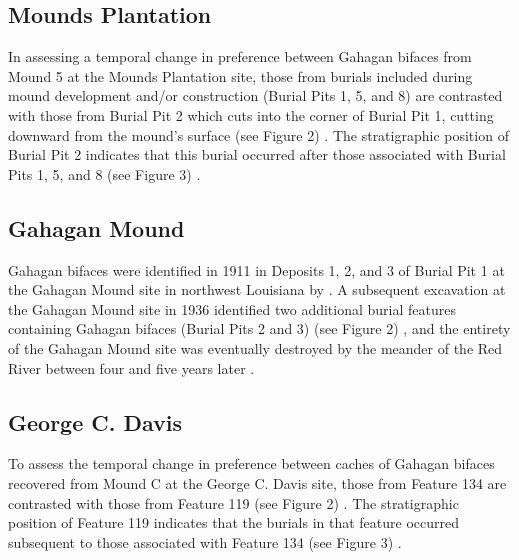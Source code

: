 \documentclass[]{interact}
\theoremstyle{plain}%
\theoremstyle{definition}
\theoremstyle{remark}
\begin{document}
\hypertarget{mounds-plantation}{%
\subsection{Mounds Plantation}\label{mounds-plantation}}

In assessing a temporal change in preference between Gahagan bifaces
from Mound 5 at the Mounds Plantation site, those from burials included
during mound development and/or construction (Burial Pits 1, 5, and 8)
are contrasted with those from Burial Pit 2 which cuts into the corner
of Burial Pit 1, cutting downward from the mound's surface (see Figure
2) \citep{RN8174}. The stratigraphic position of Burial Pit 2 indicates
that this burial occurred after those associated with Burial Pits 1, 5,
and 8 (see Figure 3) \citep{RN8174}.

\hypertarget{gahagan-mound}{%
\subsection{Gahagan Mound}\label{gahagan-mound}}

Gahagan bifaces were identified in 1911 in Deposits 1, 2, and 3 of
Burial Pit 1 at the Gahagan Mound site in northwest Louisiana by
\citet[Figures 18-19, 21]{RN7115}. A subsequent excavation at the
Gahagan Mound site in 1936 identified two additional burial features
containing Gahagan bifaces (Burial Pits 2 and 3) (see Figure 2)
\citep[Plate 27]{RN8176}, and the entirety of the Gahagan Mound site was
eventually destroyed by the meander of the Red River between four and
five years later \citep{RN10759}.

\hypertarget{george-c.-davis}{%
\subsection{George C. Davis}\label{george-c.-davis}}

To assess the temporal change in preference between caches of Gahagan
bifaces recovered from Mound C at the George C. Davis site, those from
Feature 134 are contrasted with those from Feature 119 (see Figure 2)
\citep{RN5746, RN8186}. The stratigraphic position of Feature 119
indicates that the burials in that feature occurred subsequent to those
associated with Feature 134 (see Figure 3) \citep{RN5746, RN8186}.
\end{document}
